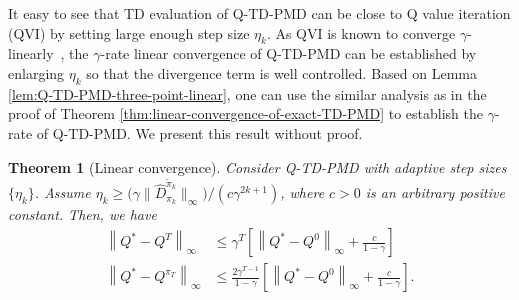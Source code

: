 \documentclass[10pt]{article}
\newcommand{\ls}{\left}
\newcommand{\rs}{\right}
\theoremstyle{plain}
\newtheorem{theorem}{Theorem}[section]
\theoremstyle{definition}
\begin{document}
It easy to see that TD evaluation of Q-TD-PMD can be close to Q value iteration (QVI)  by setting large enough step size $\eta_k$. As QVI is known to converge $\gamma$-linearly~\cite{suttonRL}, the $\gamma$-rate linear convergence of Q-TD-PMD can be established by enlarging $\eta_k$ so that the divergence term is well controlled. Based on Lemma \ref{lem:Q-TD-PMD-three-point-linear}, one can use the similar analysis as in the proof of Theorem \ref{thm:linear-convergence-of-exact-TD-PMD} to establish the $\gamma$-rate of Q-TD-PMD. We present this result without proof. 
\begin{theorem}[Linear convergence]
    \label{thm:linear-convergence-of-exact-Q-TD-PMD}
    Consider  Q-TD-PMD  with adaptive step sizes $\{ \eta_k \}$. Assume $\eta_k \geq {(\gamma\|\hat{D}_{\pi_k}^{\tilde{\pi}_k} \|_\infty})/{(c\gamma^{2k+1})}$,
    where $c > 0$ is an arbitrary positive constant. Then, we have
    \begin{align}
        \ls\| Q^* - Q^T \rs\|_\infty &\leq \gamma^T \ls[ \ls\| Q^* - Q^0 \rs\|_\infty + \frac{c}{1-\gamma} \rs]
        \label{eq:linear-convergence-of-output-value-Q-TD-PMD} \\
        \ls\| Q^* - Q^{\pi_T} \rs\|_\infty &\leq \frac{2\gamma^{T-1}}{1-\gamma} \ls[ \ls\| Q^* - Q^0 \rs\|_\infty + \frac{c}{1-\gamma} \rs].
        \label{eq:linear-convergence-of-output-policy-Q-TD-PMD}
    \end{align}
\end{theorem}
\end{document}
